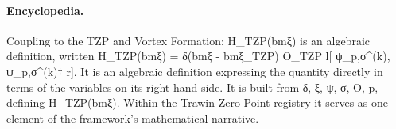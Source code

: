 \paragraph{Encyclopedia.}
Coupling to the TZP and Vortex Formation: H\_TZP(bmξ) is an algebraic definition, written H\_TZP(bmξ) = δ(bmξ - bmξ\_TZP) O\_TZP l[ ψ\_p,σ\textasciicircum{}(k), ψ\_p,σ\textasciicircum{}(k)† r]. It is an algebraic definition expressing the quantity directly in terms of the variables on its right-hand side. It is built from δ, ξ, ψ, σ, O, p, defining H\_TZP(bmξ). Within the Trawin Zero Point registry it serves as one element of the framework's mathematical narrative.
